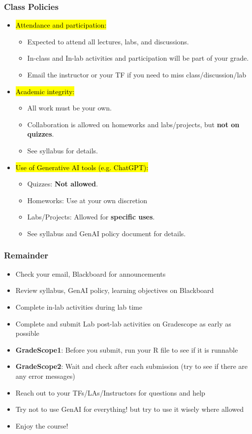 \documentclass[slidestop,compress,mathserif]{beamer}
\begin{document}
\begin{frame}
	\frametitle{Class Policies} 
	\begin{itemize}
		\item \hl{Attendance and participation:} 
		\begin{itemize}
			\item Expected to attend all lectures, labs, and discussions. 
			\item In-class and In-lab activities and participation will be part of your grade.
			\item Email the instructor or your TF if you need to miss class/discussion/lab
		\end{itemize}
		\item \hl{Academic integrity:} 
		\begin{itemize}
			\item All work must be your own. 
			\item Collaboration is allowed on homeworks and labs/projects, but \textbf{not on quizzes}. 
			\item See syllabus for details.
		\end{itemize}
		\item \hl{Use of Generative AI tools (e.g. ChatGPT):}
		\begin{itemize}
			\item Quizzes: \textbf{Not allowed}.
			\item Homeworks: Use at your own discretion
			\item Labs/Projects: Allowed for \textbf{specific uses}.
			\item See syllabus and GenAI policy document for details.
		\end{itemize}
	\end{itemize}
\end{frame}

\begin{frame}
	\frametitle{Remainder}
	\begin{itemize}
		\item Check your email, Blackboard for announcements
		\item Review syllabus, GenAI policy, learning objectives on Blackboard
		\item Complete in-lab activities during lab time
		\item Complete and submit Lab post-lab activities on Gradescope as early as possible
		\item \textbf{GradeScope1}: Before you submit, run your R file to see if it is runnable 
		\item \textbf{GradeScope2}: Wait and check after each submission (try to see if there are any error messages)
		\item Reach out to your TFs/LAs/Instructors for questions and help
		\item Try not to use GenAI for everything! but try to use it wisely where allowed
		\item Enjoy the course!
	\end{itemize}
\end{frame}




\end{document}
